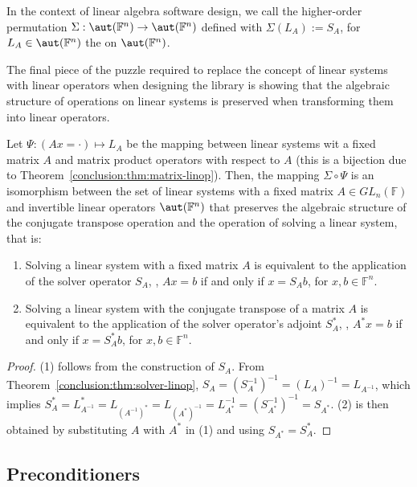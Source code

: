 \begin{definition}
\label{conclusion:def:solver-factory}
In the context of linear algebra software design, we call the higher-order
permutation $\Sigma : \aut(\mathbb{F}^n) \rightarrow \aut(\mathbb{F}^n)$ defined
with $\Sigma(L_A) := S_A$, for $L_A \in \aut(\mathbb{F}^n)$ the  on $\aut(\mathbb{F}^n)$.
\end{definition}

The final piece of the puzzle required to replace the concept of linear systems
with linear operators when designing the library is showing that the algebraic
structure of operations on linear systems is preserved when transforming them
into linear operators.

\begin{corollary}
\label{conclusion:cor:solver-linop}
Let $\Psi : (Ax = \cdot) \mapsto L_A$ be the mapping between linear systems wit
a fixed matrix $A$ and matrix product operators with respect to $A$ (this is a
bijection due to Theorem~\ref{conclusion:thm:matrix-linop}).
Then, the mapping $\Sigma \circ \Psi$ is an isomorphism between the set of
linear systems with a fixed matrix $A \in GL_n(\mathbb{F})$ and invertible
linear operators $\aut(\mathbb{F}^n)$ that preserves the algebraic structure of
the conjugate transpose operation and the operation of solving a linear system,
that is:
\begin{enumerate}
\item Solving a linear system with a fixed matrix $A$ is equivalent to the
application of the solver operator $S_A$, \ie, $Ax = b$ if and only if $x =
S_Ab$, for $x, b \in \mathbb{F}^n$.
\item Solving a linear system with the conjugate transpose of a matrix $A$ is
equivalent to the application of the solver operator's adjoint $S_A^*$, \ie,
$A^*x = b$ if and only if $x = S_A^*b$, for $x, b \in \mathbb{F}^n$.
\end{enumerate}
\end{corollary}

\begin{proof}
(1) follows from the construction of $S_A$. From
Theorem~\ref{conclusion:thm:solver-linop}, $S_A = (S_A^{-1})^{-1} = (L_A)^{-1} =
L_{A^{-1}}$, which implies $S_A^* = L_{A^{-1}}^* = L_{(A^{-1})^*} =
L_{(A^*)^{-1}} = L_{A^*}^{-1} = (S_{A^*}^{-1})^{-1} = S_{A^*}$. (2) is then
obtained by substituting $A$ with $A^*$ in (1) and using $S_{A^*} = S_A^*$.
\end{proof}

\subsection{Preconditioners}

